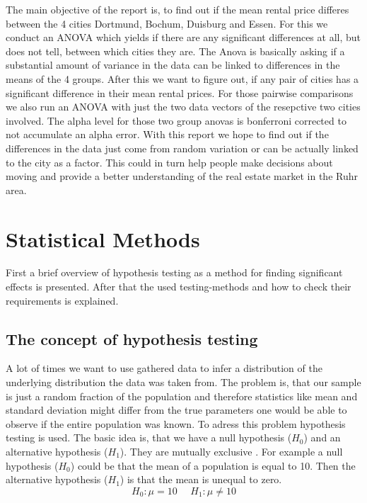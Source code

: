\documentclass[12 pt]{scrartcl}
\begin{document}
The main objective of the report is, to find out if the mean rental price differes between the 4 cities Dortmund, Bochum, Duisburg and Essen. For this we conduct an ANOVA which yields if there are any significant differences at all, but does not tell, between which cities they are. The Anova is basically asking if a substantial amount of variance in the data can be linked to differences in the means of the 4 groups.
After this we want to figure out, if any pair of cities has a significant difference in their mean rental prices. For those pairwise comparisons we also run an ANOVA with just the two data vectors of the resepctive two cities involved. The alpha level for those two group anovas is bonferroni corrected to not accumulate an alpha error.
With this report we hope to find out if the differences in the data just come from random variation or can be actually linked to the city as a factor. This could in turn help people make decisions about moving and provide a better understanding of the real estate market in the Ruhr area.

\section{Statistical Methods}

First a brief overview of hypothesis testing as a method for finding significant effects is presented. After that the used testing-methods and how to check their requirements is explained.

\subsection{The concept of hypothesis testing}

A lot of times we want to use gathered data to infer a distribution of the underlying distribution the data was taken from. The problem is, that our sample is just a random fraction of the population and therefore statistics like mean and standard deviation might differ from the true parameters one would be able to observe if the entire population was known.
To adress this problem hypothesis testing is used. The basic idea is, that we have a null hypothesis ($H_0$) and an alternative hypothesis ($H_1$). They are mutually exclusive \citep[p.~218]{eid2017statistik}.
For example a null hypothesis ($H_0$) could be that the mean of a population is equal to 10. Then the alternative hypothesis ($H_1$) is that the mean is unequal to zero.
\[ H_0: \mu = 10  \ \ \ \ \ \   H_1: \mu \neq 10 \]
\end{document}
